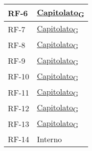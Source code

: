 \begin{longtable}{|>{\centering\arraybackslash}m{}|>{\centering\arraybackslash}m{}|}
	RF-6               & \href{https://7last.github.io/docs/rtb/documentazione-interna/glossario\#capitolato}{Capitolato\textsubscript{G}}                                                                                                                                    \\\hline
	RF-7               & \href{https://7last.github.io/docs/rtb/documentazione-interna/glossario\#capitolato}{Capitolato\textsubscript{G}}                                                                                                                                    \\\hline
	RF-8               & \href{https://7last.github.io/docs/rtb/documentazione-interna/glossario\#capitolato}{Capitolato\textsubscript{G}}                                                                                                                                    \\\hline
	RF-9               & \href{https://7last.github.io/docs/rtb/documentazione-interna/glossario\#capitolato}{Capitolato\textsubscript{G}}                                                                                                                                    \\\hline
	RF-10              & \href{https://7last.github.io/docs/rtb/documentazione-interna/glossario\#capitolato}{Capitolato\textsubscript{G}}                                                                                                                                    \\\hline
	RF-11              & \href{https://7last.github.io/docs/rtb/documentazione-interna/glossario\#capitolato}{Capitolato\textsubscript{G}}                                                                                                                                    \\\hline
	RF-12              & \href{https://7last.github.io/docs/rtb/documentazione-interna/glossario\#capitolato}{Capitolato\textsubscript{G}}                                                                                                                                    \\\hline
	RF-13              & \href{https://7last.github.io/docs/rtb/documentazione-interna/glossario\#capitolato}{Capitolato\textsubscript{G}}                                                                                                                                    \\\hline
	RF-14              & Interno                                                                                                                                                                                                                                              \\\hline

\end{longtable}
